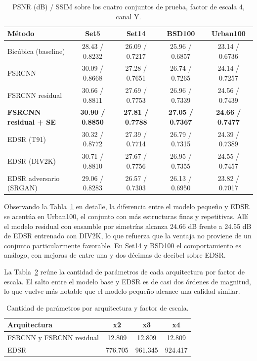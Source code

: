 \documentclass[conference]{IEEEtran}
\begin{document}
\begin{table}[!t]
\caption{PSNR (dB) / SSIM sobre los cuatro conjuntos de prueba, factor de escala 4, canal Y.}
\label{tab:full}
\centering
\begin{tabular}{lcccc}
\toprule
Método & Set5 & Set14 & BSD100 & Urban100 \\
\midrule
Bicúbica (baseline) & 28.43 / 0.8232 & 26.09 / 0.7217 & 25.96 / 0.6857 & 23.14 / 0.6736 \\
FSRCNN & 30.09 / 0.8668 & 27.28 / 0.7651 & 26.74 / 0.7265 & 24.14 / 0.7257 \\
FSRCNN residual & 30.66 / 0.8811 & 27.69 / 0.7753 & 26.96 / 0.7339 & 24.56 / 0.7439 \\
\textbf{FSRCNN residual + SE} & \textbf{30.90 / 0.8850} & \textbf{27.81 / 0.7788} & \textbf{27.05 / 0.7367} & \textbf{24.66 / 0.7477} \\
EDSR (T91) & 30.32 / 0.8772 & 27.39 / 0.7714 & 26.79 / 0.7315 & 24.39 / 0.7389 \\
EDSR (DIV2K) & 30.71 / 0.8810 & 27.67 / 0.7756 & 26.95 / 0.7355 & 24.55 / 0.7457 \\
EDSR adversario (SRGAN) & 29.06 / 0.8283 & 26.57 / 0.7303 & 26.13 / 0.6950 & 23.82 / 0.7017 \\
\bottomrule
\end{tabular}
\end{table}

Observando la Tabla~\ref{tab:full} en detalle, la diferencia entre el modelo pequeño y EDSR se
acentúa en Urban100, el conjunto con más estructuras finas y repetitivas. Allí el modelo residual
con ensamble por simetrías alcanza 24.66 dB frente a 24.55 dB de EDSR entrenado con DIV2K, lo que
refuerza que la ventaja no proviene de un conjunto particularmente favorable. En Set14 y BSD100 el
comportamiento es análogo, con mejoras de entre una y dos décimas de decibel sobre EDSR.

La Tabla~\ref{tab:params} reúne la cantidad de parámetros de cada arquitectura por factor de
escala. El salto entre el modelo base y EDSR es de casi dos órdenes de magnitud, lo que vuelve más
notable que el modelo pequeño alcance una calidad similar.

\begin{table}[!htb]
\caption{Cantidad de parámetros por arquitectura y factor de escala.}
\label{tab:params}
\centering
\begin{tabular}{lccc}
\toprule
Arquitectura & x2 & x3 & x4 \\
\midrule
FSRCNN y FSRCNN residual & 12.809 & 12.809 & 12.809 \\
EDSR & 776.705 & 961.345 & 924.417 \\
\bottomrule
\end{tabular}
\end{table}
\end{document}
